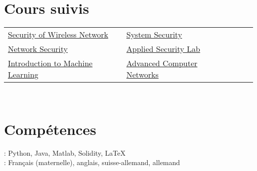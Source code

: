 \documentclass[mm, 11pt]{simple_style}
\begin{document}
\begin{resume}
\section{Cours suivis}
    \begin{tabular}{lllll}
        \href{http://www.syssec.ethz.ch/education/sown/sown_AS16.html}{Security of Wireless Network} & \href{http://www.syssec.ethz.ch/education/system_security/system_security_as16.html}{System Security}\\
        \href{https://netsec.ethz.ch/courses/netsec-2016/}{Network Security} & \href{http://www.infsec.ethz.ch/education/as2016.html}{Applied Security Lab} \\
        \href{https://www.cs.cmu.edu/~10601b/}{Introduction to Machine Learning} & \href{https://ndal.ethz.ch/courses/acn.html}{Advanced Computer Networks}\\
    \end{tabular}\\
\sectionline
\section{Comp\'etences}
: Python, Java, Matlab, Solidity, \LaTeX\\
: Fran\c{c}ais (maternelle), anglais, suisse-allemand, allemand\\
\sectionline

\end{resume}
\end{document}
